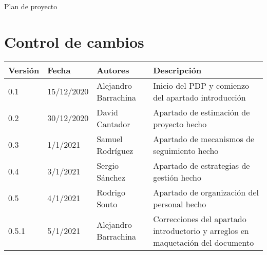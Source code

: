 \documentclass[12pt]{article}
\title{\nombredelproyecto}
\author{Alejandro Barrachina Argudo \\
David Cantador Piedras \\
Rodrigo Sosa Sáez \\
Juan Pantaleón Femenía Quevedo \\
David Llanes Martín \\
Sergio Sánchez Chamizo  \\
Samuel Rodríguez Moreno \\
Rodrigo Souto Santos
}
\date{\today}
\begin{document}
\begin{titlepage}
	\makeatletter
	{
		\centering
		\vspace*{4cm}
		{\fontsize{40pt}{40pt}\scshape\textbf{\@title}\par}


		{\Huge Plan de proyecto\par}

		\vspace*{1cm}
		{\Large\itshape
			\@author
			\par}
	}
	\vfill
	\makeatother
\end{titlepage}
\newpage

\section*{Control de cambios} %
\noindent\begin{tabularx}{\textwidth}{ |l|l|p{5cm}|X| }
	\hline
	\textbf{Versión}       & \textbf{Fecha}                                                                   & \textbf{Autores}              & \textbf{Descripción}                                                            \\
	\hline
	0.1                    & 15/12/2020                                                                       & Alejandro Barrachina          & Inicio del PDP y comienzo del apartado introducción                             \\
	\hline
	0.2                    & 30/12/2020                                                                       & David Cantador                & Apartado de estimación de proyecto hecho                                        \\
	\hline
	0.3                    & 1/1/2021                                                                         & Samuel Rodríguez              & Apartado de mecanismos de seguimiento hecho                                     \\
	\hline
	0.4                    & 3/1/2021                                                                         & Sergio Sánchez                & Apartado de estrategias de gestión hecho                                        \\
	\hline
	0.5                    & 4/1/2021                                                                         & Rodrigo Souto                 & Apartado de organización del personal hecho                                     \\
	\hline
	0.5.1                  & 5/1/2021                                                                         & Alejandro Barrachina          & Correcciones del apartado introductorio y arreglos en maquetación del documento \\

\end{tabularx}
\end{document}
